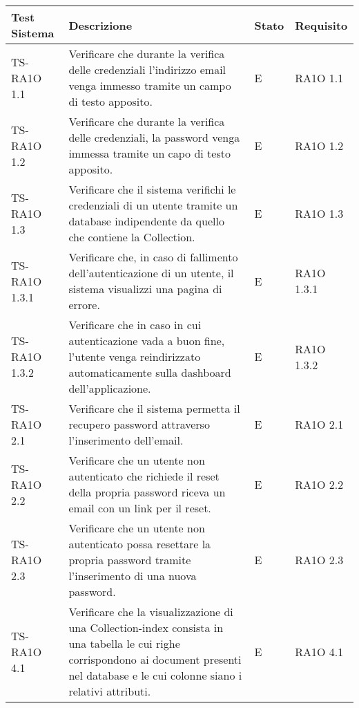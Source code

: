 

	\begin{center}
	\def\arraystretch{1.5}
	\bgroup
		\begin{longtable}{| p{3cm} | p{6cm} | p{1.5cm} | p{2cm} | }
		\hline 
		 \textbf{Test Sistema} & \textbf{Descrizione} & \textbf{Stato} & \textbf{Requisito} \\ \hline
				TS-RA1O 1.1 & 
				Verificare che durante la verifica delle credenziali l'indirizzo email venga immesso tramite un campo di testo apposito. & E & RA1O 1.1 \newline  \\ \hline 
				TS-RA1O 1.2 & 
				Verificare che durante la verifica delle credenziali, la password venga immessa tramite un capo di testo apposito.
 & E & RA1O 1.2 \newline  \\ \hline 
				TS-RA1O 1.3 & 
				Verificare che il sistema verifichi le credenziali di un utente tramite un database indipendente da quello che contiene la Collection. & E & RA1O 1.3 \newline  \\ \hline 
				TS-RA1O 1.3.1 & 
				Verificare che, in caso di fallimento dell'autenticazione di un utente, il sistema visualizzi una pagina di errore. & E & RA1O 1.3.1 \newline  \\ \hline 
				TS-RA1O 1.3.2 & 
				Verificare che in caso in cui autenticazione vada a buon fine, l'utente venga reindirizzato automaticamente sulla dashboard dell'applicazione.  & E & RA1O 1.3.2 \newline  \\ \hline 
				TS-RA1O 2.1 & 
				Verificare che il sistema permetta il recupero password attraverso l'inserimento dell'email.
 & E & RA1O 2.1 \newline  \\ \hline 
				TS-RA1O 2.2 & 
				Verificare che un utente non autenticato che richiede il reset della propria password riceva un email con un link per il reset. & E & RA1O 2.2 \newline  \\ \hline 
				TS-RA1O 2.3 & 
				Verificare che un utente non autenticato possa resettare la propria password tramite l'inserimento di una nuova password.
 & E & RA1O 2.3 \newline  \\ \hline 
				TS-RA1O 4.1 & 
				Verificare che la visualizzazione di una Collection-index consista in una tabella le cui righe corrispondono ai document presenti nel database e le cui colonne siano i relativi attributi. & E & RA1O 4.1 \newline  \\ \hline 

\end{longtable}
\end{center}
